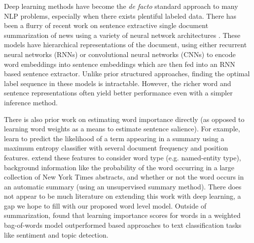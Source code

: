 Deep learning methods have become the \textit{de facto} standard approach to many 
NLP problems, especially when there exists plentiful labeled data.
There has been a flurry of recent work on sentence extractive 
single document summarization of news using a variety of neural network 
architectures 
\cite{cheng2016neural,nallapati2016classify,nallapati2016summarunner,narayan2018ranking}.
These models have hierarchical representations of the document, using
either
recurrent neural networks (RNNs) or convolutional neural networks (CNNs)
to encode word embeddings into sentence embeddings which are then fed into
an RNN based sentence extractor. 
Unlike prior structured approaches,
finding the optimal label sequence in these models is intractable. However,
the richer word and sentence representations often yield better performance
even with a simpler inference method. 








There is also prior  work on estimating word importance directly 
(as opposed to learning word weights as a means to estimate sentence salience).
For example, \cite{yih2007multi} learn to predict the likelihood
of a term appearing in a summary using a maximum entropy classifier with
several document frequency and position features. \cite{hong2014improving}
extend these features to consider word type (e.g. named-entity type),
background information like the probability of the word occurring 
in a large collection of New York Times abstracts, and whether or
not the word occurs in an automatic summary (using an unsupervised summary
method). There does not appear to be much literature on extending this work
with deep learning, a gap we hope to fill with our proposed word level model. 
Outside of summarization,
\cite{sheikh2016learning} found that learning importance scores for 
words in a weighted bag-of-words model outperformed \tfidf{} based approaches
to text classification tasks like 
sentiment and topic detection. 
 


 
